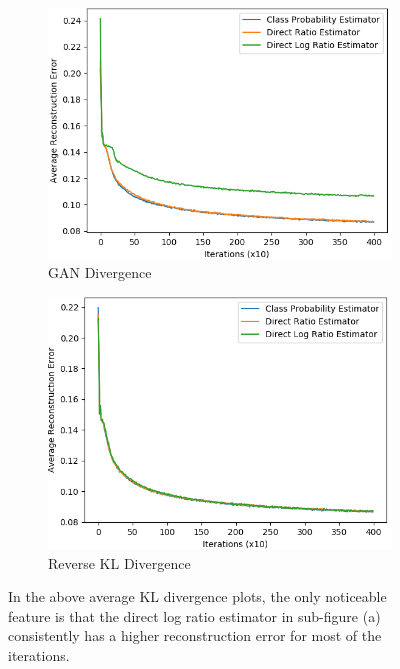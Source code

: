 \documentclass[honours,12pt]{unswthesis}
\numberwithin{equation}{section}
\theoremstyle{definition}
\begin{document}
\begin{figure}[t!]
\centering
\begin{subfigure}{0.49\textwidth}
\includegraphics[width=\linewidth]{part3reconerrors/PCADVvsPCADVexpvsPCADVgudlog.png}
\caption{GAN Divergence}
\end{subfigure}
\begin{subfigure}{0.49\textwidth}
\includegraphics[width=\linewidth]{part3reconerrors/PCKLDvsPCKLexpvsPCKLgudlog.png}
\caption{Reverse KL Divergence}
\end{subfigure}
\caption{\small In the above average KL divergence plots, the only noticeable feature is that the direct log ratio estimator in sub-figure (a) consistently has a higher reconstruction error for most of the iterations.}
\end{figure}
\end{document}
